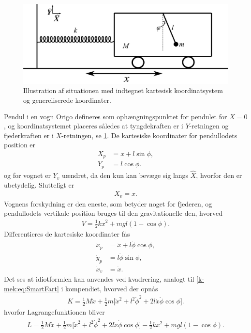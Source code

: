 \documentclass[crop=false, class=memoir]{standalone}
\begin{document}
\begin{figure}[t]
\centering
\includegraphics[width=.6\columnwidth]{Mekanik/mekfigs/PendulIVogn.pdf}
\caption{Illustration af situationen med indtegnet kartesisk koordinatsystem og genereliserede koordinater.}
\label{mek:fig:PendulIVogn}
\end{figure}
%
%
\begin{opgave}[4]{Pendul i en vogn}
\opg Origo defineres som ophængningspunktet for pendulet for $X=0$, og koordinatsystemet placeres således at tyngdekraften er i $Y$-retningen og fjederkraften er i $X$-retningen, se \cref{mek:fig:PendulIVogn}.
%
\opg De kartesiske koordinater for pendullodets position er
%
\begin{align*}
	X_p &= x + l\sin\phi, \\
	Y_p &= l\cos\phi.
\end{align*}
%
og for vognet er $Y_v$ uændret, da den kun kan bevæge sig langs $\hat{X}$, hvorfor den er ubetydelig. Slutteligt er
%
\begin{align*}
	X_v = x.
\end{align*}
%
\opg Vognens forskydning er den eneste, som betyder noget for fjederen, og pendullodets vertikale position bruges til den gravitationelle den, hvorved
%
\begin{align*}
	V = \frac{1}{2}kx^2 + mgl(1-\cos\phi).
\end{align*}
%
\opg Differentieres de kartesiske koordinater fås
\begin{align*}
	\dot{x}_p &= \dot{x} + l\dot{\phi}\cos\phi, \\
	\dot{y}_p &= l\dot{\phi}\sin\phi, \\
	\dot{x}_v &= \dot{x}.
\end{align*}
%
Det ses at idiotformlen kan anvendes ved kvadrering, analogt til \cref{k-mek:eq:SmartFart} i kompendiet, hvorved der opnås
%
\begin{align*}
	K = \frac{1}{2}M\dot{x} + \frac{1}{2}m\big[\dot{x}^2 + l^2\dot{\phi}^2 + 2l\dot{x}\dot{\phi}\cos\phi\big].
\end{align*}
%
hvorfor Lagrangefunktionen bliver
%
\begin{align*}
	L = \frac{1}{2}M\dot{x} + \frac{1}{2}m\big[\dot{x}^2 + l^2\dot{\phi}^2 + 2l\dot{x}\dot{\phi}\cos\phi\big] - \frac{1}{2}kx^2 + mgl(1-\cos\phi).

\end{align*}
\end{opgave}
\end{document}
